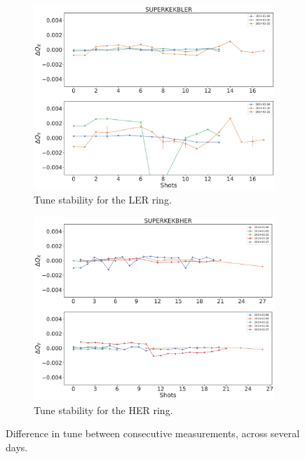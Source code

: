 \begin{figure}[!htb]
    \centering
    \begin{subfigure}[b]{0.8\textwidth}
        \includegraphics[width=\linewidth]{images/kek/SUPERKEKBLER_shots.pdf}
        \caption{Tune stability for the LER ring.}
    \end{subfigure}
    \vspace{0.5cm} 
    \begin{subfigure}[b]{0.8\textwidth}
        \includegraphics[width=\linewidth]{images/kek/SUPERKEKBHER_shots.pdf}
        \caption{Tune stability for the HER ring.}
    \end{subfigure}
    \caption{Difference in tune between consecutive measurements, across several days.}
    \label{fig:kek:shots}
\end{figure}


